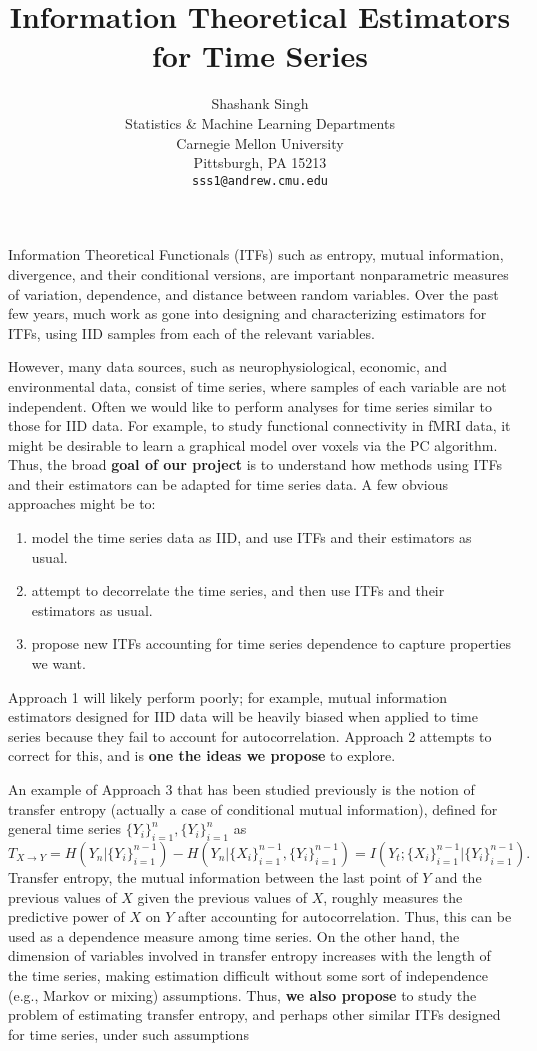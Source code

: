 \documentclass{article} %
\title{Information Theoretical Estimators for Time Series}
\author{
Shashank Singh \\
Statistics \& Machine Learning Departments \\
Carnegie Mellon University \\
Pittsburgh, PA 15213 \\
\texttt{sss1@andrew.cmu.edu}
}
\begin{document}
\vspace{-5mm}

\maketitle

\vspace{-5mm}

Information Theoretical Functionals (ITFs) such as entropy, mutual information,
divergence, and their conditional versions, are important nonparametric
measures of variation, dependence, and distance between random variables. Over
the past few years, much work as gone into designing and characterizing
estimators for ITFs, using IID samples from each of the relevant variables.

However, many data sources, such as neurophysiological, economic, and
environmental data, consist of time series, where samples of each variable are
not independent. Often we would like to perform analyses for time series
similar to those for IID data. For example, to study functional connectivity in
fMRI data, it might be desirable to learn a graphical model over voxels via the
PC algorithm. Thus, the broad {\bf goal of our project} is to understand how
methods using ITFs and their estimators can be adapted for time series data.
A few obvious approaches might be to:
\begin{enumerate}
\item model the time series data as IID, and use ITFs and their estimators as
usual.
\item attempt to decorrelate the time series, and then use ITFs and their
estimators as usual.
\item propose new ITFs accounting for time series dependence to capture
properties we want.
\end{enumerate}

Approach 1 will likely perform poorly; for example, mutual information
estimators designed for IID data will be heavily biased when applied to time
series because they fail to account for autocorrelation. Approach 2 attempts to
correct for this, and is {\bf one the ideas we propose} to explore.

An example of Approach 3 that has been studied previously is the notion of 
transfer entropy (actually a case of conditional mutual information), defined
for general time series $\{Y_i\}_{i = 1}^n, \{Y_i\}_{i = 1}^n$ as
\[T_{X \to Y}
    = H(Y_n | \{Y_i\}_{i = 1}^{n - 1}) - H(Y_n | \{X_i\}_{i = 1}^{n - 1}, \{Y_i\}_{i = 1}^{n - 1})
    = I(Y_t; \{X_i\}_{i = 1}^{n - 1} | \{Y_i\}_{i = 1}^{n - 1}).
\]
Transfer entropy, the mutual information between the last point of $Y$ and the
previous values of $X$ given the previous values of $X$, roughly measures the
predictive power of $X$ on $Y$ after accounting for autocorrelation. Thus,
this can be used as a dependence measure among time series. On the other hand,
the dimension of variables involved in transfer entropy increases with the
length of the time series, making estimation difficult without some sort of
independence (e.g., Markov or mixing) assumptions. Thus, {\bf we also propose}
to study the problem of estimating transfer entropy, and perhaps other similar
ITFs designed for time series, under such assumptions 
\end{document}
